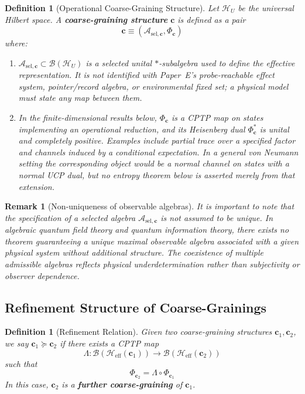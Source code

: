 \documentclass[12pt,a4paper,openany]{book}
\newtheorem{definition}[theorem]{Definition}
\newtheorem{remark}[theorem]{Remark}
\begin{document}
\begin{definition}[Operational Coarse-Graining Structure]
\label{A-def:coarse}
Let $\mathcal{H}_U$ be the universal Hilbert space. 
A \textbf{coarse-graining structure} $\mathbf{c}$ is defined as a pair
\[
\boxed{\mathbf{c} \equiv (\mathcal{A}_{\mathrm{sel},\mathbf{c}}, \Phi_{\mathbf{c}})}
\]
where:
\begin{enumerate}
\item $\mathcal{A}_{\mathrm{sel},\mathbf{c}} \subset \mathcal{B}(\mathcal{H}_U)$ is a selected unital $*$-subalgebra used to define the effective representation.  It is not identified with Paper~E's probe-reachable effect system, pointer/record algebra, or environmental fixed set; a physical model must state any map between them.
\item In the finite-dimensional results below, $\Phi_{\mathbf{c}}$ is a CPTP map on states implementing an operational reduction, and its Heisenberg dual $\Phi_{\mathbf c}^*$ is unital and completely positive.  Examples include partial trace over a specified factor and channels induced by a conditional expectation.  In a general von Neumann setting the corresponding object would be a normal channel on states with a normal UCP dual, but no entropy theorem below is asserted merely from that extension.
\end{enumerate}
\end{definition}

\begin{remark}[Non-uniqueness of observable algebras]
It is important to note that the specification of a selected algebra $\mathcal{A}_{\mathrm{sel},\mathbf{c}}$ is not assumed to be unique.
In algebraic quantum field theory and quantum information theory, there exists no theorem guaranteeing a unique maximal observable algebra associated with a given physical system without additional structure. 
The coexistence of multiple admissible algebras reflects physical underdetermination rather than subjectivity or observer dependence.
\end{remark}

\subsection{Refinement Structure of Coarse-Grainings}

\begin{definition}[Refinement Relation]
\label{A-def:refine}
Given two coarse-graining structures $\mathbf{c}_1, \mathbf{c}_2$, we say $\mathbf{c}_1 \succeq \mathbf{c}_2$ if there exists a CPTP map
\[
\Lambda: \mathcal{B}(\mathcal{H}_{\text{eff}}(\mathbf{c}_1)) \to \mathcal{B}(\mathcal{H}_{\text{eff}}(\mathbf{c}_2))
\]
such that
\[
\Phi_{\mathbf{c}_2} = \Lambda \circ \Phi_{\mathbf{c}_1}
\]
In this case, $\mathbf{c}_2$ is a \textbf{further coarse-graining} of $\mathbf{c}_1$.
\end{definition}
\end{document}
